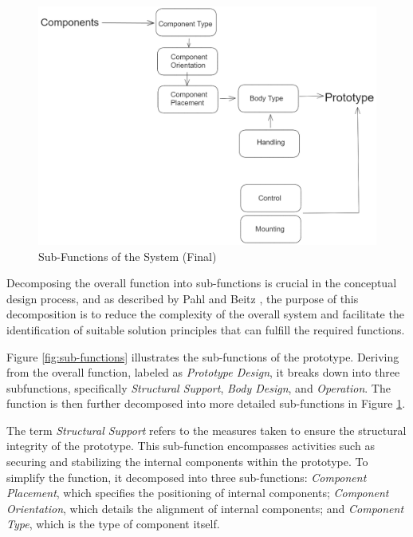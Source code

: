 \begin{figure}[ht!]
    \centering
    \includegraphics[width=\linewidth]{texs/Part1/chapter3/image/subfunction2.png}
    \caption{Sub-Functions of the System (Final)}
    \label{fig:sub-functions-final}
\end{figure}

Decomposing the overall function into sub-functions is crucial in the conceptual design process, and as described by Pahl and Beitz \cite[170]{Pahl2007}, the purpose of this decomposition is to reduce the complexity of the overall system and facilitate the identification of suitable solution principles that can fulfill the required functions.

Figure \ref{fig:sub-functions} illustrates the sub-functions of the prototype. Deriving from the overall function, labeled as \textit{Prototype Design}, it breaks down into three subfunctions, specifically \textit{Structural Support}, \textit{Body Design}, and \textit{Operation}. The function is then further decomposed into more detailed sub-functions in Figure \ref{fig:sub-functions-final}.

The term \textit{Structural Support} refers to the measures taken to ensure the structural integrity of the prototype. This sub-function encompasses activities such as securing and stabilizing the internal components within the prototype. To simplify the function, it decomposed into three sub-functions:  \textit{Component Placement}, which specifies the positioning of internal components; \textit{Component Orientation}, which details the alignment of internal components; and \textit{Component Type}, which is the type of component itself.

